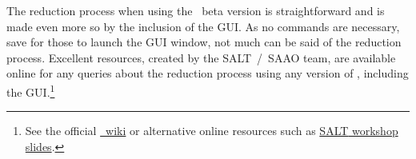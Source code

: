 The reduction process when using the \polsalt\ beta version is straightforward and is made even more so by the inclusion of the \gls{GUI}. As no commands are necessary, save for those to launch the \gls{GUI} window, not much can be said of the reduction process. Excellent resources, created by the \gls{SALT}~/~\gls{SAAO} team, are available online for any queries about the reduction process using any version of \polsalt, including the \gls{GUI}.\footnote{See the official \href{https://github.com/saltastro/polsalt/wiki}{\polsalt\ wiki} or alternative online resources such as \href{https://saltworkshop2022.salt.ac.za/wp-content/uploads/2022/11/DG_polsalt_SALT_workshop_2022_finalversion.pdf}{\gls{SALT} workshop slides}.}

